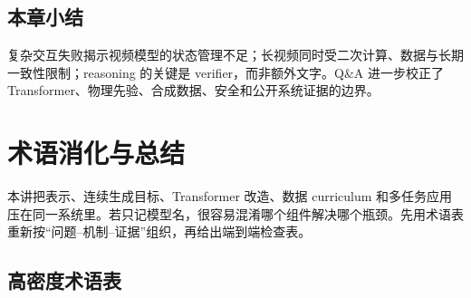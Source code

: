 \documentclass[a4paper]{article}
\begin{document}

\subsection{本章小结}

复杂交互失败揭示视频模型的状态管理不足；长视频同时受二次计算、数据与长期一致性限制；reasoning 的关键是 verifier，而非额外文字。Q\&A 进一步校正了 Transformer、物理先验、合成数据、安全和公开系统证据的边界。

\section{术语消化与总结}

本讲把表示、连续生成目标、Transformer 改造、数据 curriculum 和多任务应用压在同一系统里。若只记模型名，很容易混淆哪个组件解决哪个瓶颈。先用术语表重新按“问题--机制--证据”组织，再给出端到端检查表。

\subsection{高密度术语表}
\end{document}

